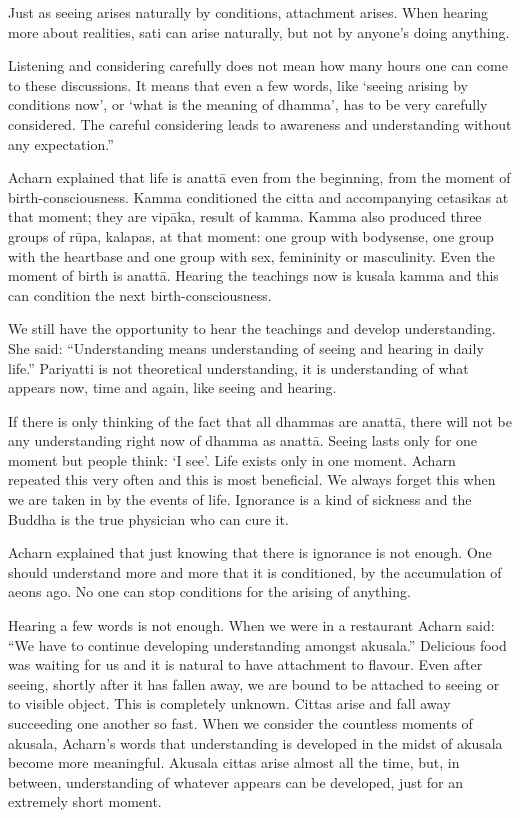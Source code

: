 Just as seeing arises naturally by conditions, attachment arises. When
hearing more about realities, sati can arise naturally, but not by
anyone's doing anything.

Listening and considering carefully does not mean how many hours one can
come to these discussions. It means that even a few words, like `seeing
arising by conditions now', or `what is the meaning of dhamma', has to
be very carefully considered. The careful considering leads to awareness
and understanding without any expectation.''

Acharn explained that life is anattā even from the beginning, from the
moment of birth-consciousness. Kamma conditioned the citta and
accompanying cetasikas at that moment; they are vipāka, result of kamma.
Kamma also produced three groups of rūpa, kalapas, at that moment: one
group with bodysense, one group with the heartbase and one group with
sex, femininity or masculinity. Even the moment of birth is anattā.
Hearing the teachings now is kusala kamma and this can condition the
next birth-consciousness.

We still have the opportunity to hear the teachings and develop understanding. She said: ``Understanding means understanding of seeing and
hearing in daily life.'' Pariyatti is not theoretical understanding, it
is understanding of what appears now, time and again, like seeing and
hearing.

If there is only thinking of the fact that all dhammas are anattā, there
will not be any understanding right now of dhamma as anattā. Seeing
lasts only for one moment but people think: `I see'. Life exists only in
one moment. Acharn repeated this very often and this is most beneficial.
We always forget this when we are taken in by the events of life.
Ignorance is a kind of sickness and the Buddha is the true physician who
can cure it.

Acharn explained that just knowing that there is ignorance is not
enough. One should understand more and more that it is conditioned, by
the accumulation of aeons ago. No one can stop conditions for the
arising of anything.

Hearing a few words is not enough. When we were in a restaurant Acharn
said: ``We have to continue developing understanding amongst akusala.''
Delicious food was waiting for us and it is natural to have attachment
to flavour. Even after seeing, shortly after it has fallen away, we are
bound to be attached to seeing or to visible object. This is completely
unknown. Cittas arise and fall away succeeding one another so fast. When
we consider the countless moments of akusala, Acharn's words that
understanding is developed in the midst of akusala become more
meaningful. Akusala cittas arise almost all the time, but, in between,
understanding of whatever appears can be developed, just for an
extremely short moment.

